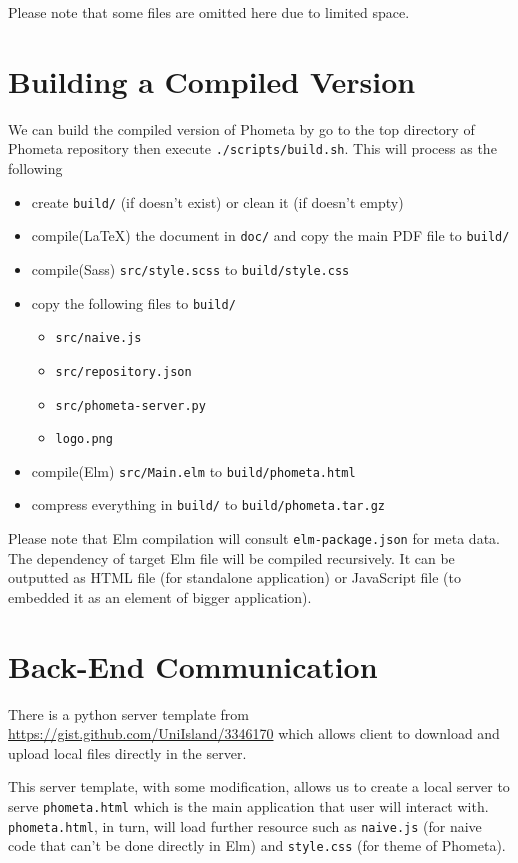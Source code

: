 \documentclass[master.tex]{subfiles}
\begin{document}
Please note that some files are omitted here due to limited space.

\newpage


\section{Building a Compiled Version}
We can build the compiled version of Phometa by go to the top directory of
Phometa repository then execute \texttt{./scripts/build.sh}. This will process
as the following
\begin{itemize}
\item create \texttt{build/} (if doesn't exist) or clean it (if doesn't empty)
\item compile(\LaTeX) the document in \texttt{doc/} and copy the main PDF file to \texttt{build/}
\item compile(Sass) \texttt{src/style.scss} to \texttt{build/style.css}
\item copy the following files to \texttt{build/}
  \begin{itemize}
  \item \texttt{src/naive.js}
  \item \texttt{src/repository.json}
  \item \texttt{src/phometa-server.py}
  \item \texttt{logo.png}
  \end{itemize}
\item compile(Elm) \texttt{src/Main.elm} to \texttt{build/phometa.html}
\item compress everything in \texttt{build/} to \texttt{build/phometa.tar.gz}
\end{itemize}

Please note that Elm compilation will consult \texttt{elm-package.json} for meta
data. The dependency of target Elm file will be compiled recursively. It can be
outputted as HTML file (for standalone application) or JavaScript file (to
embedded it as an element of bigger application).

\section{Back-End Communication}
There is a python server template from
\url{https://gist.github.com/UniIsland/3346170} which allows client to
download and upload local files directly in the server.

This server template, with some modification, allows us to create a local server
to serve \texttt{phometa.html} which is the main application that user will
interact with. \texttt{phometa.html}, in turn, will load further resource such
as \texttt{naive.js} (for naive code that can't be done directly in Elm) and
\texttt{style.css} (for theme of Phometa).
\end{document}
